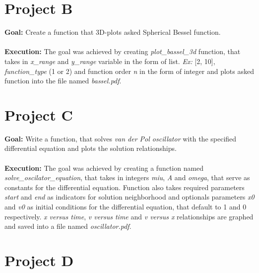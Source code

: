 \documentclass[a4paper,12pt]{article}
\begin{document}
\section{Project B}

\textbf{Goal:} Create a function that 3D-plots asked Spherical Bessel function. \\ \\ \textbf{Execution:} The goal was achieved by creating \textit{plot\_bassel\_3d} function, that takes in \textit{x\_range} and \textit{y\_range} variable in the form of list. \textit{Ex:} [2, 10], \textit{function\_type} (1 or 2) and function order \textit{n} in the form of integer and plots asked function into the file named \textit{bassel.pdf}.


\section{Project C}

\textbf{Goal:} Write a function, that solves \textit{van der Pol oscillator} with the specified differential equation and plots the solution relationships. \\ \\ \textbf{Execution:} The goal was achieved by creating a function named \textit{solve\_oscilator\_equation}, that takes in integers \textit{miu}, \textit{A} and \textit{omega}, that serve as constants for the differential equation. Function also takes required parameters \textit{start} and \textit{end} as indicators for solution neighborhood and optionals parameters \textit{x0} and \textit{v0} as initial conditions for the differential equation, that default to 1 and 0 respectively. \textit{x versus time}, \textit{v versus time} and \textit{v versus x} relationships are graphed and saved into a file named \textit{oscillator.pdf}. 


\section{Project D}
\end{document}
